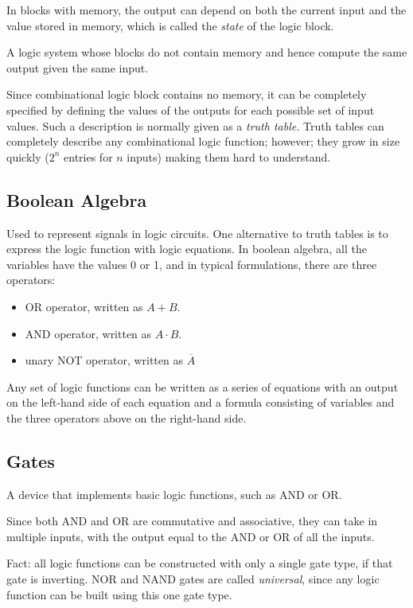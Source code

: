 \documentclass[12pt]{article}
\begin{document}
In blocks with memory, the output can depend on both the current input and the value stored in memory, which is called the \emph{state} of the logic block.

\begin{definition}
    A logic system whose blocks do not contain memory and hence compute the same output given the same input.
\end{definition}

Since combinational logic block contains no memory, it can be completely specified by defining the values of the outputs for each possible set of input values. Such a description is normally given as a \emph{truth table.} Truth tables can completely describe any combinational logic function; however; they grow in size quickly ($2^n$ entries for $n$ inputs) making them hard to understand.

\subsection*{Boolean Algebra}
Used to represent signals in logic circuits. One alternative to truth tables is to express the logic function with logic equations. In boolean algebra, all the variables have the values 0 or 1, and in typical formulations, there are three operators:

\begin{itemize}
    \item OR operator, written as $A + B$.
    \item AND operator, written as $A \cdot B$.
    \item unary NOT operator, written as $\overline{A}$
\end{itemize}

Any set of logic functions can be written as a series of equations with an output on the left-hand side of each equation and a formula consisting of variables and the three operators above on the right-hand side.

\subsection*{Gates}
A device that implements basic logic functions, such as AND or OR.

Since both AND and OR are commutative and associative, they can take in multiple inputs, with the output equal to the AND or OR of all the inputs.

Fact: all logic functions can be constructed with only a single gate type, if that gate is inverting. NOR and NAND gates are called \emph{universal}, since any logic function can be built using this one gate type.
\end{document}
